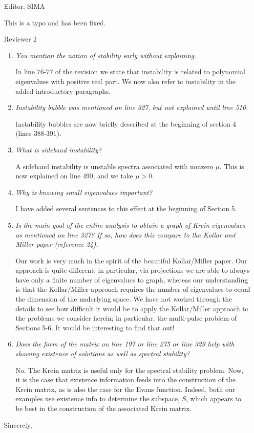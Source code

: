 \documentclass[11pt]{letter}
\begin{document}
\begin{letter}{Editor, SIMA}
\begin{enumerate}
This is a typo and has been fixed.%

\end{enumerate}

Reviewer 2
\begin{enumerate}
\item \emph{You mention the notion of stability early without explaining.}
\vspace{4mm}

In line 76-77 of the revision we state that instability is related to polynomial eigenvalues with positive real part. We now also refer to instability in the added introductory paragraphs.

\item \emph{Instability bubble was mentioned on line 327, but not explained until line 510.}

Instability bubbles are now briefly described at the beginning of section 4 (lines 388-391).

\item \emph{What is sideband instability?}

A sideband instability is unstable spectra associated with nonzero $\mu$. This is now explained on line 490, and we take $\mu > 0$.

\item \emph{Why is knowing small eigenvalues important?}

I have added several sentences to this effect at the beginning of Section 5.

\item \emph{Is the main goal of the entire analysis to obtain a graph of Krein eigenvalues as mentioned on line 327? If so, how does this compare to the Kollar and Miller paper (reference 24). }

Our work is very much in the spirit of the beautiful Kollar/Miller paper. Our approach is quite different; in particular, via projections we are able to always have only a finite number of eigenvalues to graph, whereas our understanding is that the Kollar/Miller approach requires the number of eigenvalues to equal the dimension of the underlying space. We have not worked through the details to see how difficult it would be to apply the Kollar/Miller approach to the problems we consider herein; in particular, the multi-pulse problem of Sections 5-6. It would be interesting to find that out!

\item \emph{Does the form of the matrix on line 197 or line 275 or line 329 help with showing existence of solutions as well as spectral stability?}

No. The Krein matrix is useful only for the spectral stability problem. Now, it is the case that existence information feeds into the construction of the Krein matrix, as is also the case for the Evans function. Indeed, both our examples use existence info to determine the subspace, $S$, which appears to be best in the construction of the associated Krein matrix.

\end{enumerate}


\closing{Sincerely,}

\end{letter}
\end{document}
